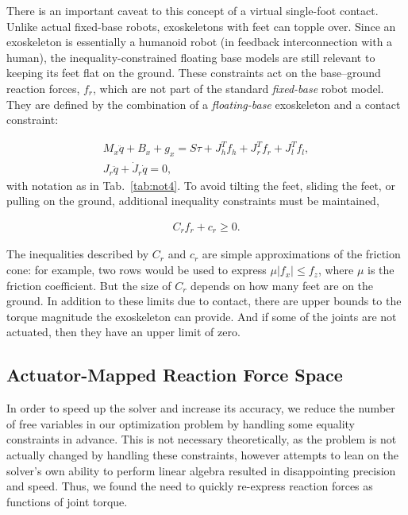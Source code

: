 \documentclass[utf8]{frontiersSCNS}
\renewcommand*{\cite}[1]{\citep{#1}}
\begin{document}
There is an important caveat to this concept of a virtual single-foot contact.
Unlike actual fixed-base robots, exoskeletons with feet can topple over.
Since an exoskeleton is essentially a humanoid robot (in feedback interconnection with a human), the inequality-constrained floating base models \cite{KoolenEA2016IJHR,KimEA2016TRO,KimJorgensenHwangSentis2018Humanoids,MungaiGrizzle2020Access} are still relevant to keeping its feet flat on the ground.
These constraints act on the base--ground reaction forces, $f_r$, which are not part of the standard \emph{fixed-base} robot model. They are defined by the combination of a \emph{floating-base} exoskeleton and a contact constraint:

\vspace{-2em}\begin{gather}
M_x \ddot q + B_x + g_x = S \tau + J_h^T f_h + J_r^T f_r + J_l^T f_l,\label{eq:physical_dynamics_1}\\
J_r \ddot q + \dot J_r \dot q = 0,\label{eq:physical_dyamics_2}
\end{gather}
with notation as in  Tab.~\ref{tab:not4}. To avoid tilting the feet, sliding the feet, or pulling on the ground, additional inequality constraints must be maintained,

\vspace{-2em}\begin{gather}
C_r f_r + c_r \geq 0.\label{eq:contact_inequalities}
\end{gather}

The inequalities described by $C_r$ and $c_r$ are simple approximations of the friction cone: for example, two rows would be used to express $\mu |f_x|\leq f_z$, where $\mu$ is the friction coefficient. But the size of $C_r$ depends on how many feet are on the ground. In addition to these limits due to contact, there are upper bounds to the torque magnitude the exoskeleton can provide. And if some of the joints are not actuated, then they have an upper limit of zero. 


\subsection{Actuator-Mapped Reaction Force Space}\label{sec:actuator_mapped}
In order to speed up the solver and increase its accuracy, we reduce the number of free variables in our optimization problem by handling some equality constraints in advance. This is not necessary theoretically, as the problem is not actually changed by handling these constraints, however attempts to lean on the solver's own ability to perform linear algebra resulted in disappointing precision and speed. Thus, we found the need to quickly re-express reaction forces as functions of joint torque.
\end{document}
